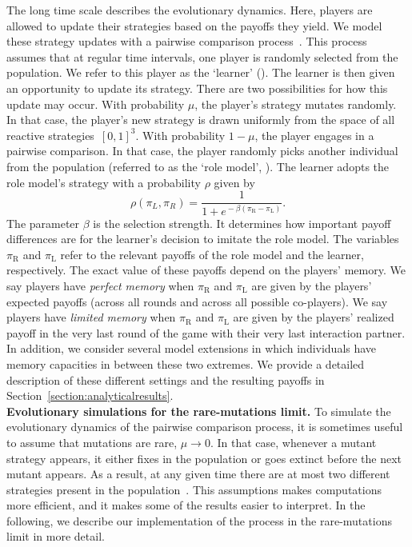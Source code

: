 \documentclass[11pt]{article}
\def\rolemodel{\text{R}}
\def\learner{\text{L}}
\theoremstyle{plainCl1}
\theoremstyle{plainCl2}
\begin{document}
The long time scale describes the evolutionary dynamics. 
Here, players are allowed to update their strategies based on the payoffs they yield. 
We model these strategy updates with a pairwise comparison process~\citep{traulsen2007pairwise}.
This process assumes that at regular time intervals, one player is randomly selected from the population.
We refer to this player as the `learner' (\learner). 
The learner is then given an opportunity to update its strategy. 
There are two possibilities for how this update may occur. 
With probability $\mu$, the player's strategy mutates randomly. 
In that case, the player's new strategy is drawn uniformly from the space of all reactive strategies~$[0,1]^3$.  
With probability $1\!-\!\mu$, the player engages in a pairwise comparison. 
In that case, the player randomly picks another individual from the population (referred to as the `role model', \rolemodel). 
The learner adopts the role model's strategy with a probability \(\rho\) given by
\begin{equation} \label{Eq:rho}
    \rho(\pi_{L}, \pi_{R}) = \frac{1}{1\!+\! e^{\!-\!\beta (\pi_\rolemodel - \pi_\learner)}}.
\end{equation}
The parameter \(\beta\) is the selection strength.
It determines how important payoff differences are for the learner's decision to imitate the role model. 
The variables $\pi_\rolemodel$ and $\pi_\learner$ refer to the relevant payoffs of the role model and the learner, respectively. 
The exact value of these payoffs depend on the players' memory. 
We say players have {\it perfect memory} when $\pi_\rolemodel$ and $\pi_\learner$ are given by the players' expected payoffs (across all rounds and across all possible co-players). 
We say players have {\it limited memory} when $\pi_\rolemodel$ and $\pi_\learner$ are given by the players' realized payoff in the very last round of the game with their very last interaction partner. 
In addition, we consider several model extensions in which individuals have memory capacities in between these two extremes. 
We provide a detailed description of these different settings and the resulting payoffs in Section~\ref{section:analyticalresults}.\\


\noindent
{\bf Evolutionary simulations for the rare-mutations limit.} 
To simulate the evolutionary dynamics of the pairwise comparison process, it is sometimes useful to assume that mutations are rare, $\mu\!\rightarrow\!0$. 
In that case, whenever a mutant strategy appears, it either fixes in the population or goes extinct before the next mutant appears. 
As a result, at any given time there are at most two different strategies present in the population~\citep{fudenberg:JET:2006,wu:JMB:2012,mcavoy:jet:2015}. 
This assumptions makes computations more efficient, and it makes some of the results easier to interpret.
In the following, we describe our implementation of the process in the rare-mutations limit in more detail. 
\end{document}
